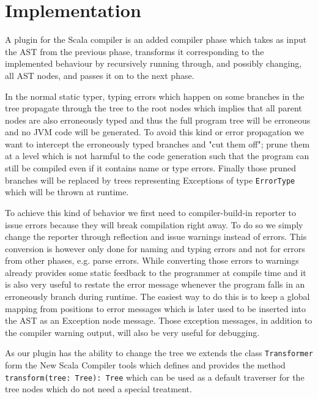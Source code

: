 \section{Implementation}

A plugin for the Scala compiler is an added compiler phase which takes as input the AST from the previous phase, transforms it corresponding to the implemented behaviour by recursively running through, and possibly changing, all AST nodes, and passes it on to the next phase.

In the normal static typer, typing errors which happen on some branches in the tree propagate through the tree to the root nodes which implies that all parent nodes are also erroneously typed and thus the full program tree will be erroneous and no JVM code will be generated. To avoid this kind or error propagation we want to intercept the erroneously typed branches and "cut them off"; prune them at a level which is not harmful to the code generation such that the program can still be compiled even if it contains name or type errors. Finally those pruned
branches will be replaced by trees representing Exceptions of type \texttt{ErrorType} which will be thrown at runtime.

To achieve  this kind of behavior we first need to compiler-build-in reporter to issue errors because they will break compilation right away. To do so we simply change the reporter through reflection and issue warnings instead of errors. This conversion is however only done for naming and typing errors and not for errors from other phases, e.g. parse errors. While converting those errors to warnings already provides some static feedback to the programmer at compile time and it is also very useful to restate the error message whenever the program falls
in an erroneously branch during runtime. The easiest way to do this is to keep a global mapping from positions to error messages which is later used to be inserted into the AST as an Exception node message. Those exception messages, in addition to the compiler warning output, will also be very useful for debugging.

As our plugin has the ability to change the tree we extends the class \texttt{Transformer} form the New Scala Compiler tools which defines and provides the method \texttt{transform(tree: Tree): Tree} which can be used as a default traverser for the tree nodes which do not need a special treatment.

